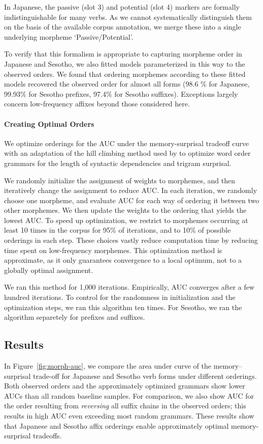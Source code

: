 In Japanese, the passive (slot 3) and potential (slot 4) markers are formally indistinguishable for many verbs.
As we cannot systematically distinguish them on the basis of the available corpus annotation, we merge these into a single underlying morpheme `Passive/Potential'.


To verify that this formalism is appropriate to capturing morpheme order in Japanese and Sesotho, we also fitted models parameterized in this way to the observed orders.
We found that ordering morphemes according to these fitted models recovered the observed order for almost all forms (98.6 \% for Japanese, 99.93\% for Sesotho prefixes, 97.4\% for Sesotho suffixes).
Exceptions largely concern low-frequency affixes beyond those considered here.


\paragraph{Creating Optimal Orders}

We optimize orderings for the AUC under the memory-surprisal tradeoff curve with an adaptation of the hill climbing method used by \citet{gildea-human-2015} to optimize word order grammars for the length of syntactic dependencies and trigram surprisal.

We randomly initialize the assignment of weights to morphemes, and then iteratively change the assignment to reduce AUC.
In each iteration, we randomly choose one morpheme, and evaluate AUC for each way of ordering it between two other morphemes.
We then update the weights to the ordering that yields the lowest AUC.
To speed up optimization, we restrict to morphemes occurring at least 10 times in the corpus for 95\% of iterations, and to 10\% of possible orderings in each step.
These choices vastly reduce computation time by reducing time spent on low-frequency morphemes.
This optimization method is approximate, as it only guarantees convergence to a local optimum, not to a globally optimal assignment.

We ran this method for 1,000 iterations. Empirically, AUC converges after a few hundred iterations.
To control for the randomness in initialization and the optimization steps, we ran this algorithm ten times.
For Sesotho, we ran the algorithm separetely for prefixes and suffixes.

\subsection{Results}
In Figure~\ref{fig:morph-auc}, we compare the area under curve of the memory--surprisal trade-off for Japanese and Sesotho verb forms under different orderings.
Both observed orders and the approximately optimized grammars show lower AUCs than all random baseline samples.
For comparison, we also show AUC for the order resulting from \emph{reversing} all suffix chains in the observed orders; this results in high AUC even exceeding most random grammars.
These results show that Japanese and Sesotho affix orderings enable approximately optimal memory-surprisal tradeoffs.



